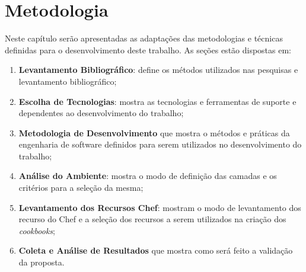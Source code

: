 \newpage\null\thispagestyle{empty}\newpage
\chapter{Metodologia}
\label{chap:metod}

Neste capítulo serão apresentadas as adaptações das metodologias e técnicas
definidas para o desenvolvimento deste trabalho. As seções estão dispostas
em:

\begin{enumerate}
  \item \textbf{Levantamento Bibliográfico}: define os métodos utilizados nas
    pesquisas e levantamento bibliográfico;
  \item \textbf{Escolha de Tecnologias}: mostra as tecnologias e
    ferramentas de suporte e dependentes ao desenvolvimento do trabalho;
  \item \textbf{Metodologia de Desenvolvimento} que mostra o métodos e práticas da engenharia de software
    definidos para serem utilizados no desenvolvimento do trabalho;
  \item \textbf{Análise do Ambiente}: mostra o modo de definição das camadas e os critérios para
    a seleção da mesma;
  \item \textbf{Levantamento dos Recursos Chef}: mostram o modo de levantamento dos recurso do Chef
    e a seleção dos recursos a serem utilizados na criação dos \textit{cookbooks};
  \item \textbf{Coleta e Análise de Resultados} que mostra como será feito a validação da proposta.
\end{enumerate}







